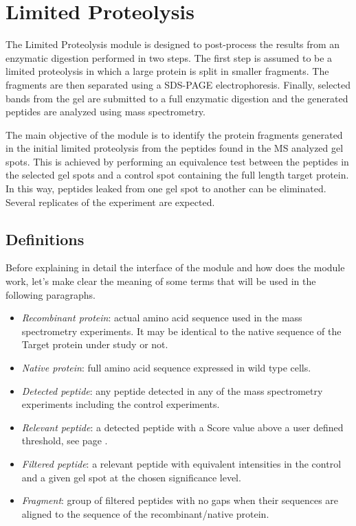 \chapter{Limited Proteolysis}
\label{chap:limprot}

The Limited Proteolysis module is designed to post-process the results from an enzymatic
digestion performed in two steps. The first step is assumed to be a limited proteolysis
in which a large protein is split in smaller fragments. The fragments are then separated
using a SDS-PAGE electrophoresis. Finally, selected bands from the gel are submitted to
a full enzymatic digestion and the generated peptides are analyzed using mass spectrometry.

The main objective of the module is to identify the protein fragments generated in
the initial limited proteolysis from the peptides found in the MS analyzed gel spots.
This is achieved by performing an equivalence test\cite{Limentani2005a} between the
peptides in the selected gel spots and a control spot containing the full length
target protein. In this way, peptides leaked from one gel spot to another can be
eliminated. Several replicates of the experiment are expected.

\section{Definitions}
\label{sec:limprotDefinitions}

Before explaining in detail the interface of the module and how does the module
work, let's make clear the meaning of some terms that will be used in the following
paragraphs.

\begin{itemize}
    \item \textit{Recombinant protein}: actual amino acid sequence used in the mass
    spectrometry experiments. It may be identical to the native sequence of the Target
    protein under study or not.
    \item \textit{Native protein}: full amino acid sequence expressed in wild type cells.
    \item \textit{Detected peptide}: any peptide detected in any of the mass spectrometry
    experiments including the control experiments.
    \item \textit{Relevant peptide}: a detected peptide with a Score value above
    a user defined threshold, see page \pageref{par:limprotScoreValue}.
    \item \textit{Filtered peptide}: a relevant peptide with equivalent intensities
    in the control and a given gel spot at the chosen significance level.\label{par:limprotFP}
    \item \textit{Fragment}: group of filtered peptides with no gaps when their
    sequences are aligned to the sequence of the recombinant/native protein.
\end{itemize}

